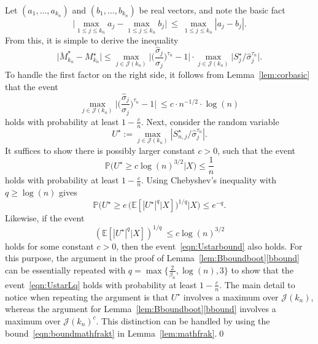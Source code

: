 \documentclass[aos,preprint]{imsart}
\numberwithin{equation}{section}
\theoremstyle{plain}
\renewcommand{\hat}[1]{\widehat{#1}}
\newcommand{\J}{\mathcal{J}}
\renewcommand{\P}{\mathbb{P}}
\newcommand{\E}{\mathbb{E}}
\newcommand{\ts}{\textstyle}
\newcommand{\1}{{\bf{1}}}
\newcommand{\0}{\mathbf{0}}
\begin{document}
\proof Let $(a_1,\dots,a_{k_n})$ and $(b_1,\dots,b_{k_n})$ be real vectors, and note the basic fact
$$\bigg|\max_{1\leq j\leq k_n} a_j -\max_{1\leq j\leq k_n}b_j\bigg| \ \leq \ \max_{1\leq j\leq k_n} |a_j-b_j|.$$
From this, it is simple to derive the inequality
\begin{equation}
\big| \breve M_{k_n}^{\star}-M_{k_n}^{\star}\big| \leq \max_{j\in\J(k_n)}\Big|\big(\ts\frac{\hat\sigma_j}{\sigma_j}\big)^{\tau_n}-1\Big|\cdot \displaystyle \max_{j\in\J(k_n)}\Big|S_j^{\star}/\hat\sigma_j^{\tau_n}\Big|.
\end{equation}
To handle the first factor on the right side, it follows from Lemma~\ref{lem:corbasic} that the event
\begin{equation}
\max_{j\in\J(k_n)}\Big|\big(\ts\frac{\hat\sigma_j}{\sigma_j}\big)^{\tau_n}-1\Big| \ \leq c\cdot n^{-1/2}\cdot \log(n)
\end{equation}
holds with probability at least $1-\frac cn$. Next,  consider the random variable
\begin{equation}\label{eqn:Ustar}
U^{\star}:=\max_{j\in\J(k_n)} |S_{n,j}^{\star}/\hat\sigma_j^{\tau_n}|.
\end{equation}
It suffices to show there is possibly larger constant $c>0$, such that the event
\begin{equation}\label{eqn:Ustarbound}
\P\Big( U^{\star} \geq  c \log(n)^{3/2} \Big| X\Big) \leq \ts\frac 1n 
\end{equation}
holds with probability at least $1-\frac cn$.
%
Using Chebyshev's inequality  with $q\geq \log(n)$ gives
 $$\P\Big(U^{\star} \geq e\, \big(\E[|U^{\star}|^q|X]\big)^{1/q}\Big| X\Big)\leq e^{-q}.$$
Likewise, if the event
 \begin{equation}\label{eqn:UstarLq}
 (\E[|U^{\star}|^q|X])^{1/q} \ \leq c\log(n)^{3/2}
 \end{equation}
holds for some constant $c>0$, then the event~\eqref{eqn:Ustarbound} also holds. For this purpose, the argument in the proof of Lemma~\ref{lem:Bboundboot}\eqref{bbound} can be essentially repeated with $q=\max\{\frac{2}{\beta_n},\log(n),3\big\}$ to show that the event~\eqref{eqn:UstarLq} holds with probability at least $1-\frac cn$. The main detail to notice when repeating the argument is that $U^{\star}$ involves a maximum over $\J(k_n)$, whereas the argument for Lemma~\ref{lem:Bboundboot}\eqref{bbound} involves a maximum over $\J(k_n)^c$. This distinction can be handled by using the bound~\eqref{eqn:boundmathfrakt} in Lemma~\ref{lem:mathfrak}.\qed
\end{document}
